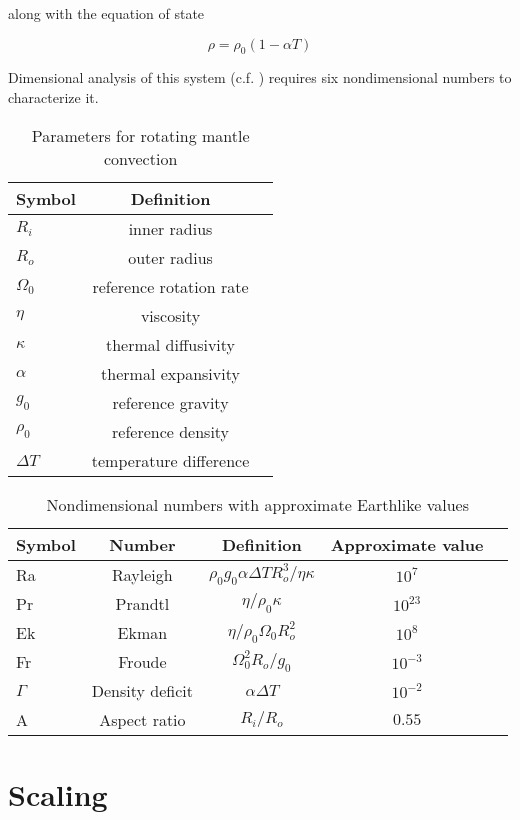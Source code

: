 \documentclass{gji}
\begin{document}
along with the equation of state

\begin{equation}
\rho = \rho_0 \left( 1 - \alpha T \right)
\label{eos}
\end{equation}

Dimensional analysis of this system (c.f. \cite{barenblatt1996scaling}) requires six nondimensional numbers to characterize it.

\begin{table}
\caption{Parameters for rotating mantle convection}
\label{parameters}
\begin{tabular}{@{}lcc}
Symbol & Definition\\
\hline
$R_i$ & inner radius \\
$R_o$ & outer radius \\
$\Omega_0$ & reference rotation rate \\
$\eta$ & viscosity \\
$\kappa$ & thermal diffusivity \\
$\alpha$ & thermal expansivity \\
$g_0$ & reference gravity \\
$\rho_0$ & reference density \\
$\Delta T$ & temperature difference \\ 
\end{tabular}
\end{table}

\begin{table}
\caption{Nondimensional numbers with approximate Earthlike values}
\label{nondim}
\begin{tabular}{@{}lcccc}
Symbol &  Number & Definition & Approximate value \\
\hline
Ra & Rayleigh &  $\rho_0 g_0 \alpha \Delta T R_o^3/\eta \kappa$ & $10^7$\\
Pr & Prandtl & $\eta/\rho_0 \kappa$ & $10^{23}$ \\
Ek & Ekman & $\eta/\rho_0 \Omega_0 R_{o}^2$ & $10^8$ \\
Fr & Froude & $\Omega_0^2 R_o/g_0$ & $10^{-3}$ \\
$\Gamma$ & Density deficit & $\alpha \Delta T$ & $10^{-2}$ \\
A & Aspect ratio & $R_i/R_o$ & $0.55$ \\
\end{tabular}
\end{table}
 



\section{Scaling}
\end{document}
